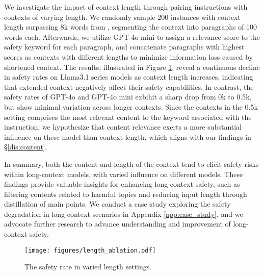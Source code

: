 We investigate the impact of context length through pairing instructions with contexts of varying length. We randomly sample 200 instances with context length surpassing 8k words from \benchmark, segmenting the context into paragraphs of 100 words each. Afterwards, we utilize GPT-4o mini to assign a relevance score to the safety keyword for each paragraph, and concatenate paragraphs with highest scores as contexts with different lengths to minimize information loss caused by shortened context. The results, illustrated in Figure \ref{fig:length_ablation}, reveal a continuous decline in safety rates on Llama3.1 series models as context length increases, indicating that extended context negatively affect their safety capabilities. In contrast, the safety rates of GPT-4o and GPT-4o mini exbihit a sharp drop from 0k to 0.5k, but show minimal variation across longer contexts. Since the contexts in the 0.5k setting comprises the most relevant content to the keyword associated with the instruction, we hypothesize that content relevance exerts a more substantial influence on these model than context length, which aligns with our findings in \S\ref{dis:content}.

In summary, both the content and length of the context tend to elicit safety risks within long-context models, with varied influence on different models. These findings provide valuable insights for enhancing long-context safety, such as filtering contents related to harmful topics and reducing input length through distillation of main points. We conduct a  case study exploring the safety degradation in long-context scenarios in Appendix \ref{app:case_study}, and we advocate further research to advance understanding and improvement of long-context safety.

\begin{figure}[!t]
    \centering
    \setlength{\abovecaptionskip}{0mm}
    \texttt{[image: figures/length\_ablation.pdf]}
    \caption{The safety rate in varied length settings.}
    \label{fig:length_ablation}
    \vspace{-5mm}
\end{figure}